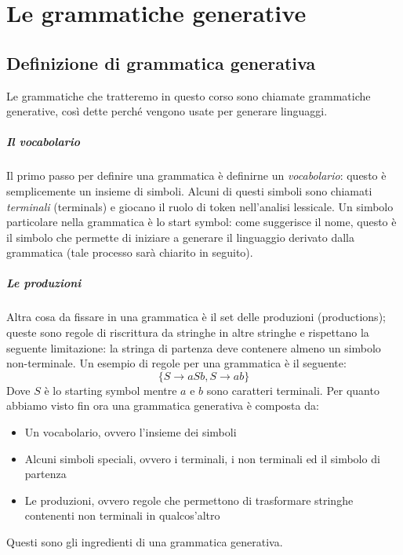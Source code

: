 \documentclass[class=book, crop=false, oneside, 12pt]{standalone}
\begin{document}
\chapter{Le grammatiche generative}

\section{Definizione di grammatica generativa}
Le grammatiche che tratteremo in questo corso sono chiamate grammatiche generative, così dette perché vengono usate per generare linguaggi.

\paragraph{Il vocabolario}
Il primo passo per definire una grammatica è definirne un \emph{vocabolario}: questo è semplicemente un insieme di simboli. Alcuni di questi simboli sono chiamati \emph{terminali} (terminals) e giocano il ruolo di token nell’analisi lessicale. Un simbolo particolare nella grammatica è lo start symbol: come suggerisce il nome, questo è il simbolo che permette di iniziare a generare il linguaggio derivato dalla grammatica (tale processo sarà chiarito in seguito).

\paragraph{Le produzioni}
Altra cosa da fissare in una grammatica è il set delle produzioni (productions); queste sono regole di riscrittura da stringhe in altre stringhe e rispettano la seguente limitazione: la stringa di partenza deve contenere almeno un simbolo non-terminale. Un esempio di regole per una grammatica è il seguente:
\begin{equation}
    \{S \to aSb, S \to ab\}
    \label{produzioni_esempio_0}
\end{equation}
Dove \(S\) è lo starting symbol mentre \(a\) e \(b\) sono caratteri terminali.
Per quanto abbiamo visto fin ora una grammatica generativa è composta da:
\begin{itemize}
    \item Un vocabolario, ovvero l'insieme dei simboli
    \item Alcuni simboli speciali, ovvero i terminali, i non terminali ed il simbolo di partenza
    \item Le produzioni, ovvero regole che permettono di trasformare stringhe contenenti non terminali in qualcos’altro
\end{itemize}
Questi sono gli ingredienti di una grammatica generativa.
\end{document}
